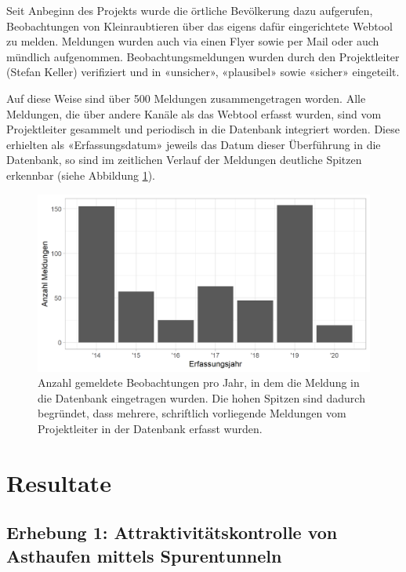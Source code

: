 \documentclass[
  oneside]{scrbook}
\begin{document}
Seit Anbeginn des Projekts wurde die örtliche Bevölkerung dazu aufgerufen, Beobachtungen von Kleinraubtieren über das eigens dafür eingerichtete Webtool zu melden. Meldungen wurden auch via einen Flyer sowie per Mail oder auch mündlich aufgenommen. Beobachtungsmeldungen wurden durch den Projektleiter (Stefan Keller) verifiziert und in «unsicher», «plausibel» sowie «sicher» eingeteilt.

Auf diese Weise sind über 500 Meldungen zusammengetragen worden. Alle Meldungen, die über andere Kanäle als das Webtool erfasst wurden, sind vom Projektleiter gesammelt und periodisch in die Datenbank integriert worden. Diese erhielten als «Erfassungsdatum» jeweils das Datum dieser Überführung in die Datenbank, so sind im zeitlichen Verlauf der Meldungen deutliche Spitzen erkennbar (siehe Abbildung \ref{fig:beobachtungsmeldungenhistogramm}).



\begin{figure}
\includegraphics[width=1\linewidth]{images/beobachtungsmeldungen_histogramm} \caption{Anzahl gemeldete Beobachtungen pro Jahr, in dem die Meldung in die Datenbank eingetragen wurden. Die hohen Spitzen sind dadurch begründet, dass mehrere, schriftlich vorliegende Meldungen vom Projektleiter in der Datenbank erfasst wurden.}\label{fig:beobachtungsmeldungenhistogramm}
\end{figure}

\hypertarget{resultate}{%
\chapter{Resultate}\label{resultate}}

\hypertarget{erhebung-1-attraktivituxe4tskontrolle-von-asthaufen-mittels-spurentunneln-1}{%
\section{Erhebung 1: Attraktivitätskontrolle von Asthaufen mittels Spurentunneln}\label{erhebung-1-attraktivituxe4tskontrolle-von-asthaufen-mittels-spurentunneln-1}}
\end{document}
